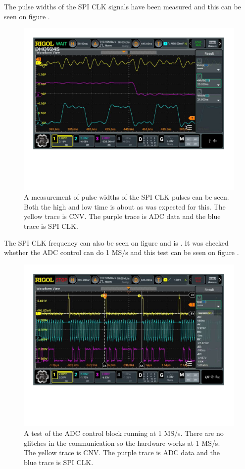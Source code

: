 The pulse widths of the SPI CLK signals have been measured and this can be seen on figure .
\begin{figure}[H]
    \centering
    \includegraphics[clip, trim=0 150 0 0, width=1\textwidth]{Appendix/Figures/A_ADC_CONTROL_PULSEWIDTH.pdf}
    \caption{A measurement of pulse widths of the SPI CLK pulses can be seen. Both the high and low time is about  as was expected for this.  The yellow trace is CNV. The purple trace is ADC data and the blue trace is SPI CLK.}
    \label{fig:A_ADC_CONTROL_SPICLKWIDTH}
\end{figure}

The SPI CLK frequency can also be seen on figure  and is . It was checked whether the ADC control can do 1 MS/s and this test can be seen on figure .

\begin{figure}[H]
    \centering
    \includegraphics[clip, trim=0 150 0 0, width=1\textwidth]{Appendix/Figures/7_2_8_ADC_CONTROL_1MEGSAMPLE_MEAS.pdf}
    \caption{A test of the ADC control block running at 1 MS/s. There are no glitches in the communication so the hardware works at 1 MS/s. The yellow trace is CNV. The purple trace is ADC data and the blue trace is SPI CLK.}
    \label{fig:A_ADC_CONTROL_1MSS}
\end{figure}